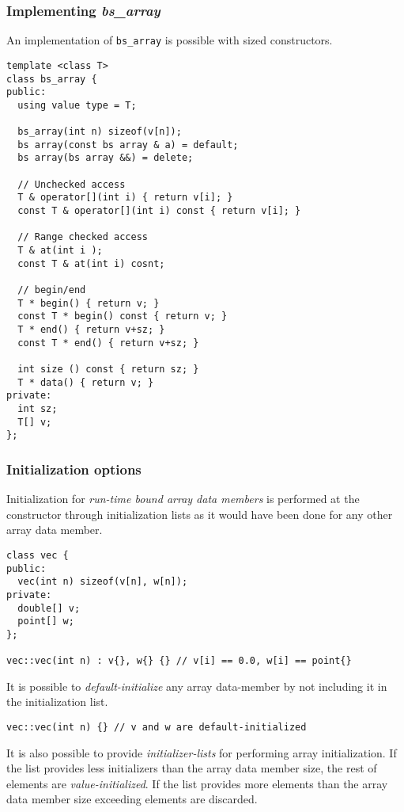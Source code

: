 \subsubsection{Implementing \emph{bs\_array}}

An implementation of \verb+bs_array+ is possible with sized constructors.

\begin{lstlisting}
template <class T>
class bs_array {
public:
  using value type = T;

  bs_array(int n) sizeof(v[n]);
  bs array(const bs array & a) = default;
  bs array(bs array &&) = delete;

  // Unchecked access
  T & operator[](int i) { return v[i]; }
  const T & operator[](int i) const { return v[i]; }

  // Range checked access
  T & at(int i );
  const T & at(int i) cosnt;

  // begin/end
  T * begin() { return v; }
  const T * begin() const { return v; }
  T * end() { return v+sz; }
  const T * end() { return v+sz; }

  int size () const { return sz; }
  T * data() { return v; }
private:
  int sz;
  T[] v;
};
\end{lstlisting}

\subsubsection{Initialization options}

Initialization for \emph{run-time bound array data members} is performed at the
constructor through initialization lists as it would have been done for any
other array data member.

\begin{lstlisting}
class vec {
public:
  vec(int n) sizeof(v[n], w[n]);
private:
  double[] v;
  point[] w;
};

vec::vec(int n) : v{}, w{} {} // v[i] == 0.0, w[i] == point{}
\end{lstlisting}

It is possible to \emph{default-initialize} any array data-member by not
including it in the initialization list.

\begin{lstlisting}
vec::vec(int n) {} // v and w are default-initialized
\end{lstlisting}

It is also possible to provide \emph{initializer-lists} for performing array
initialization. If the list provides less initializers than the array data
member size, the rest of elements are \emph{value-initialized}. If the list
provides more elements than the array data member size exceeding elements are
discarded.

